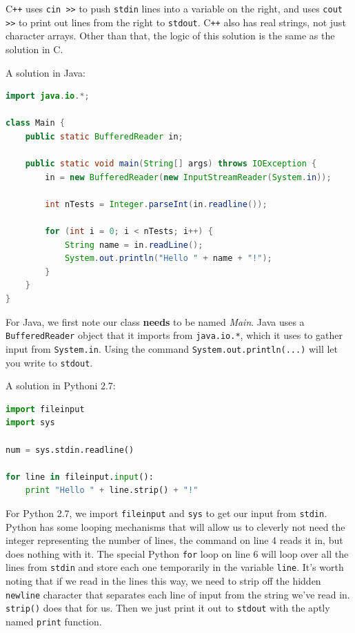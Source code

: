 \documentclass[a4paper]{article}
\begin{document}
C\texttt{++} uses \texttt{cin >>} to push \texttt{stdin} lines into a variable on the right, and uses \texttt{cout >>} to print out lines from the right to \texttt{stdout}. C\texttt{++} also has real strings, not just character arrays. Other than that, the logic of this solution is the same as the solution in C.

A solution in Java:
\begin{lstlisting}[language=Java]
import java.io.*;

class Main {
    public static BufferedReader in;

    public static void main(String[] args) throws IOException {
        in = new BufferedReader(new InputStreamReader(System.in));

        int nTests = Integer.parseInt(in.readline());

        for (int i = 0; i < nTests; i++) {
            String name = in.readLine();
            System.out.println("Hello " + name + "!");
        }
    }
}
\end{lstlisting}

For Java, we first note our class \textbf{needs} to be named \textit{Main}. Java uses a \texttt{BufferedReader} object that it imports from \texttt{java.io.*}, which it uses to gather input from \texttt{System.in}. Using the command \texttt{System.out.println(...)} will let you write to \texttt{stdout}.

A solution in Pythoni 2.7:
\begin{lstlisting}[language=Python]
import fileinput
import sys

num = sys.stdin.readline()

for line in fileinput.input():
    print "Hello " + line.strip() + "!"
\end{lstlisting}

For Python 2.7, we import \texttt{fileinput} and \texttt{sys} to get our input from \texttt{stdin}. Python has some looping mechanisms that will allow us to cleverly not need the integer representing the number of lines, the command on line 4 reads it in, but does nothing with it. The special Python \texttt{for} loop on line 6 will loop over all the lines from \texttt{stdin} and store each one temporarily in the variable \texttt{line}. It's worth noting that if we read in the lines this way, we need to strip off the hidden \texttt{newline} character that separates each line of input from the string we've read in. \texttt{strip()} does that for us. Then we just print it out to \texttt{stdout} with the aptly named \texttt{print} function.
\newpage
\end{document}
